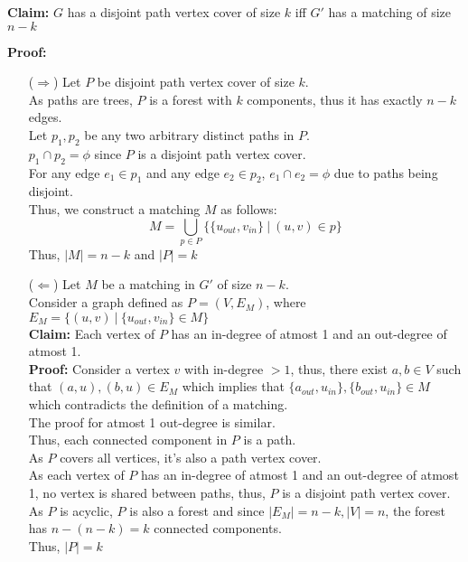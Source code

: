 \documentclass[11pt, fleqn]{article}
\begin{document}
\medskip
\textbf{Claim:} $G$ has a disjoint path vertex cover of size $k$ iff $G'$ has a matching of size $n - k$

\smallskip
\textbf{Proof:}
\begin{itemize}
    \item[($\Rightarrow$)] 
    Let $P$ be disjoint path vertex cover of size $k$.\\
    As paths are trees, $P$ is a forest with $k$ components, thus it has exactly $n-k$ edges.\\
    Let $p_1, p_2$ be any two arbitrary distinct paths in $P$.\\
    $p_1 \cap p_2 = \phi$ since $P$ is a disjoint path vertex cover.\\
    For any edge $e_1 \in p_1$ and any edge $e_2 \in p_2$, $e_1\cap e_2 = \phi$ due to paths being disjoint.\\
    Thus, we construct a matching $M$ as follows: 
    $$M = \bigcup_{p \in P}\{\{u_{out}, v_{in}\} \ | \ (u, v) \in p \}$$
    Thus, $|M| = n-k$ and $|P| = k$
    
    \item[($\Leftarrow$)] 
    Let $M$ be a matching in $G'$ of size $n - k$.\\
    Consider a graph defined as $P = (V, E_M)$, where $E_M = \{(u, v) \ | \ \{u_{out}, v_{in}\} \in M\} $\\
    \textbf{Claim:} Each vertex of $P$ has an in-degree of atmost 1 and an out-degree of atmost 1.\\
    \textbf{Proof:} Consider a vertex $v$ with in-degree $> 1$, thus, there exist $a, b \in V$ such that $(a, u), (b, u) \in E_M$ which implies that $\{a_{out}, u_{in}\}, \{b_{out}, u_{in}\} \in M$ which contradicts the definition of a matching.\\
    The proof for atmost 1 out-degree is similar.\\
    Thus, each connected component in $P$ is a path.\\
    As $P$ covers all vertices, it's also a path vertex cover.\\
    As each vertex of $P$ has an in-degree of atmost 1 and an out-degree of atmost 1, no vertex is shared between paths, thus, $P$ is a disjoint path vertex cover.\\
    As $P$ is acyclic, $P$ is also a forest and since $|E_M| = n-k, |V| = n$, the forest has $n - (n - k) = k$ connected components.\\
    Thus, $|P| = k$ 
    
\end{itemize}
\end{document}
